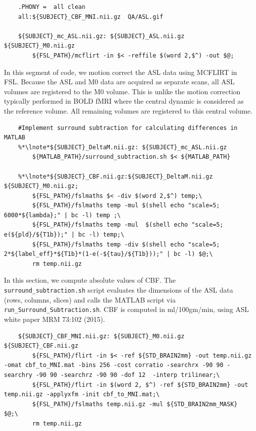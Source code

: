 \begin{lstlisting}
	.PHONY =  all clean
	all:${SUBJECT}_CBF_MNI.nii.gz  QA/ASL.gif
	
	${SUBJECT}_mc_ASL.nii.gz: ${SUBJECT}_ASL.nii.gz ${SUBJECT}_M0.nii.gz
		${FSL_PATH}/mcflirt -in $< -reffile $(word 2,$^) -out $@;
\end{lstlisting}

In this segment of code, we motion correct the ASL data using MCFLIRT in FSL. Because the ASL and M0 data are acquired as separate scans, all ASL volumes are registered to the M0 volume. This is unlike the motion correction typically performed in BOLD fMRI where the central dynamic is considered as the reference volume. All remaining volumes are registered to this central volume.

\begin{lstlisting}
	#Implement surround subtraction for calculating differences in MATLAB
	%*\lnote*${SUBJECT}_DeltaM.nii.gz: ${SUBJECT}_mc_ASL.nii.gz 
		${MATLAB_PATH}/surround_subtraction.sh $< ${MATLAB_PATH} 
	
	%*\lnote*${SUBJECT}_CBF.nii.gz:${SUBJECT}_DeltaM.nii.gz ${SUBJECT}_M0.nii.gz;
		${FSL_PATH}/fslmaths $< -div $(word 2,$^) temp;\
		${FSL_PATH}/fslmaths temp -mul $(shell echo "scale=5; 6000*${lambda};" | bc -l) temp ;\
		${FSL_PATH}/fslmaths temp -mul  $(shell echo "scale=5; e(${pld}/${T1b});" | bc -l) temp;\
		${FSL_PATH}/fslmaths temp -div $(shell echo "scale=5; 2*${label_eff}*${T1b}*(1-e(-${tau}/${T1b}));" | bc -l) $@;\
		rm temp.nii.gz
\end{lstlisting}

In this section, we compute absolute values of CBF. \lnum{4} The \texttt{surround_subtraction.sh} script evaluates the dimensions of the ASL data (rows, columns, slices) and calls the MATLAB script via \texttt{run_Surround_Subtraction.sh}.  CBF is computed in ml/100gm/min, using ASL white paper MRM 73:102 (2015). 

\begin{lstlisting}
	${SUBJECT}_CBF_MNI.nii.gz: ${SUBJECT}_M0.nii.gz ${SUBJECT}_CBF.nii.gz
		${FSL_PATH}/flirt -in $< -ref ${STD_BRAIN2mm} -out temp.nii.gz -omat cbf_to_MNI.mat -bins 256 -cost corratio -searchrx -90 90 -searchry -90 90 -searchrz -90 90 -dof 12  -interp trilinear;\
		${FSL_PATH}/flirt -in $(word 2, $^) -ref ${STD_BRAIN2mm} -out temp.nii.gz -applyxfm -init cbf_to_MNI.mat;\
		${FSL_PATH}/fslmaths temp.nii.gz -mul ${STD_BRAIN2mm_MASK} $@;\
		rm temp.nii.gz
\end{lstlisting}

